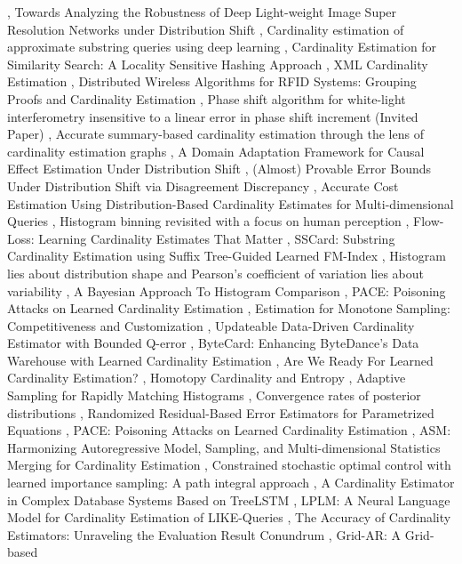 \documentclass{article}
\begin{document}
\cite{huang2024phasecbd678e6}, Towards Analyzing the Robustness of Deep Light-weight Image Super Resolution Networks under Distribution Shift \cite{esmaeilzehi2022towards3dab87da}, Cardinality estimation of approximate substring queries using deep learning \cite{kwon2022cardinality6a97d389}, Cardinality Estimation for Similarity Search: A Locality Sensitive Hashing Approach \cite{chenndcardinality86788911}, XML Cardinality Estimation \cite{paper2009xml199d1cc5}, Distributed Wireless Algorithms for RFID Systems: Grouping Proofs and Cardinality Estimation \cite{chernevanddistributed4d0087f4}, Phase shift algorithm for white-light interferometry insensitive to a linear error in phase shift increment (Invited Paper) \cite{adachi2005phase65ef03d2}, Accurate summary-based cardinality estimation through the lens of cardinality estimation graphs \cite{chen2022accurate890081fe}, A Domain Adaptation Framework for Causal Effect Estimation Under Distribution Shift \cite{li2025domainab16a5aa}, (Almost) Provable Error Bounds Under Distribution Shift via Disagreement Discrepancy \cite{rosenfeld2023almost59c8d00c}, Accurate Cost Estimation Using Distribution-Based Cardinality Estimates for Multi-dimensional Queries \cite{khachatryan2011accurate9143c3c8}, Histogram binning revisited with a focus on human perception \cite{sahann2021histogram403621d8}, Flow-Loss: Learning Cardinality Estimates That Matter \cite{negi2021flowlossc0f23370}, SSCard: Substring Cardinality Estimation using Suffix Tree-Guided Learned FM-Index \cite{zhan2025sscardb48183bc}, Histogram lies about distribution shape and Pearson's coefficient of variation lies about variability \cite{silveira2021histogram5ce3b4ea}, A Bayesian Approach To Histogram Comparison \cite{betancourt2010bayesian6f2ae782}, PACE: Poisoning Attacks on Learned Cardinality Estimation \cite{zhang2024pace4a5f4513}, Estimation for Monotone Sampling: Competitiveness and Customization \cite{cohen2012estimation963ed55c}, Updateable Data-Driven Cardinality Estimator with Bounded Q-error \cite{li2024updateable82ac5f57}, ByteCard: Enhancing ByteDance's Data Warehouse with Learned Cardinality Estimation \cite{han2024bytecard38bee07d}, Are We Ready For Learned Cardinality Estimation? \cite{wang2020ready83afb575}, Homotopy Cardinality and Entropy \cite{ortizmuoz2025homotopy5058e45e}, Adaptive Sampling for Rapidly Matching Histograms \cite{macke2017adaptive2653f55d}, Convergence rates of posterior distributions \cite{ghosal2000convergencee9c70a81}, Randomized Residual-Based Error Estimators for Parametrized Equations \cite{smetana2019randomizedcf59b2da}, PACE: Poisoning Attacks on Learned Cardinality Estimation \cite{zhang2024paceaef59253}, ASM: Harmonizing Autoregressive Model, Sampling, and Multi-dimensional Statistics Merging for Cardinality Estimation \cite{kim2024asmd41201f6}, Constrained stochastic optimal control with learned importance sampling: A path integral approach \cite{carius2021constrainedd7acabc8}, A Cardinality Estimator in Complex Database Systems Based on TreeLSTM \cite{qi2023cardinalitybc0609bd}, LPLM: A Neural Language Model for Cardinality Estimation of LIKE-Queries \cite{aytimur2024lplm3c7e1d00}, The Accuracy of Cardinality Estimators: Unraveling the Evaluation Result Conundrum \cite{rashedi2025accuracyb8a5e4b0}, Grid-AR: A Grid-based 
\end{document}
